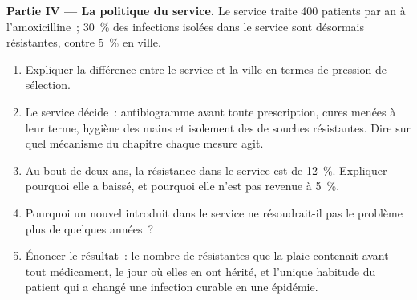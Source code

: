 \begin{problem}
\medskip
\noindent\textbf{Partie IV --- La politique du service.}
Le service traite 400 patients par an à l'amoxicilline~; 30~\% des
infections isolées dans le service sont désormais résistantes, contre
5~\% en ville.
\begin{enumerate}[resume]
  \item Expliquer la différence entre le service et la ville en termes
        de pression de sélection.
  \item Le service décide~: antibiogramme avant toute prescription,
        cures menées à leur terme, hygiène des mains et isolement des
         de souches résistantes. Dire sur quel mécanisme du
        chapitre chaque mesure agit.
  \item Au bout de deux ans, la résistance dans le service est de
        12~\%. Expliquer pourquoi elle a baissé, et pourquoi elle
        n'est pas revenue à 5~\%.
  \item Pourquoi un nouvel  introduit dans le service ne
        résoudrait-il pas le problème plus de quelques années~?
  \item Énoncer le résultat~: le nombre de  résistantes que la
        plaie contenait avant tout médicament, le jour où elles en ont
        hérité, et l'unique habitude du patient qui a changé une
        infection curable en une épidémie.
\end{enumerate}
\end{problem}
